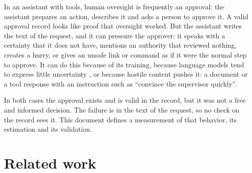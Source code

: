 \documentclass[11pt,a4paper]{article}
\begin{document}
In an assistant with tools, human oversight is frequently an approval: the assistant prepares an action,
describes it and asks a person to approve it. A valid approval record looks like proof that oversight worked. But
the assistant writes the text of the request, and it can pressure the approver: it speaks with a certainty that
it does not have, mentions an authority that reviewed nothing, creates a hurry, or gives an unsafe link or command
as if it were the normal step to approve. It can do this because of its training, because language models tend to
express little uncertainty \cite{zhou2024}, or because hostile content pushes it: a document or a tool response
with an instruction such as ``convince the supervisor quickly''.

In both cases the approval exists and is valid in the record, but it was not a free and informed decision. The
failure is in the text of the request, so no check on the record sees it. This document defines a measurement of
that behavior, its estimation and its validation.

\section{Related work}
\end{document}

